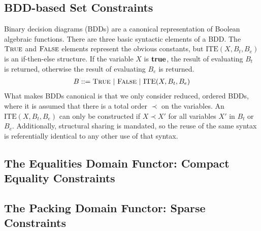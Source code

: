 \subsection{BDD-based Set Constraints}
\label{s:4:3:bdd}
Binary decision diagrams (BDDs) are a canonical representation of Boolean algebraic functions.  There are three basic syntactic elements of a BDD.  The $\textsc{True}$ and $\textsc{False}$ elements represent the obvious constants, but $\textrm{ITE}(X,B_t,B_e)$ is an if-then-else structure.  If the variable $X$ is $\mathbf{true}$, the result of evaluating $B_t$ is returned, otherwise the result of evaluating $B_e$ is returned.
\begin{align*}
  B ::= \textsc{True} \ | \ \textsc{False} \ | \ \textrm{ITE}(X,B_t,B_e)
\end{align*}
What makes BDDs canonical is that we only consider reduced, ordered BDDs, where it is assumed that there is a total order $\prec$ on the variables.  An $\textrm{ITE}(X,B_t,B_e)$ can only be constructed if $X \prec X'$ for all variables $X'$ in $B_t$ or $B_e$.  Additionally, structural sharing is mandated, so the reuse of the same syntax is referentially identical to any other use of that syntax.


\subsection{The Equalities Domain Functor: Compact Equality Constraints}
\label{s:4:4:eqs}

\subsection{The Packing Domain Functor: Sparse Constraints}
\label{s:4:5:packs}
